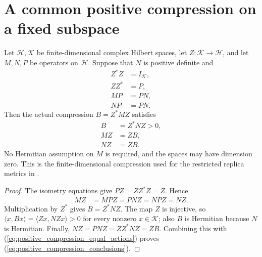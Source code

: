 \section{A common positive compression on a fixed subspace}
\label{sec:positive_projection_compression}

\begin{theorem}
\label{thm:positive_projection_compression}
\leanok

Let $\mathcal H,\mathcal K$ be finite-dimensional complex Hilbert spaces,
let $Z:\mathcal K\to\mathcal H$, and let $M,N,P$ be operators on
$\mathcal H$. Suppose that $N$ is positive definite and
\begin{align}
 Z^*Z&=I_{\mathcal K},\\
 ZZ^*&=P,\\
 MP&=PN,\\
 NP&=PN.
 \label{eq:positive_compression_hypotheses}
\end{align}
Then the actual compression $B=Z^*MZ$ satisfies
\begin{align}
 B&=Z^*NZ>0,\\
 MZ&=ZB,\\
 NZ&=ZB.
 \label{eq:positive_compression_conclusions}
\end{align}
No Hermitian assumption on $M$ is required, and the spaces may have
dimension zero. This is the finite-dimensional compression used for
the restricted replica metrics in
\cite[Section~8, lines~80--110, 299--308 and 370--381,
equation \textup{(comparator:pinned-metric)}]{OpenAI2026AreaLaw}.
\end{theorem}
\begin{proof}
\leanok

The isometry equations give $PZ=ZZ^*Z=Z$. Hence
\begin{align}
 MZ&=MPZ=PNZ=NPZ=NZ.
 \label{eq:positive_compression_equal_actions}
\end{align}
Multiplication by $Z^*$ gives $B=Z^*NZ$. The map $Z$ is injective,
so $\langle x,Bx\rangle=\langle Zx,NZx\rangle>0$ for every nonzero
$x\in\mathcal K$; also $B$ is Hermitian because $N$ is Hermitian.
Finally, $NZ=PNZ=ZZ^*NZ=ZB$. Combining this with
(\ref{eq:positive_compression_equal_actions}) proves
(\ref{eq:positive_compression_conclusions}).
\end{proof}

